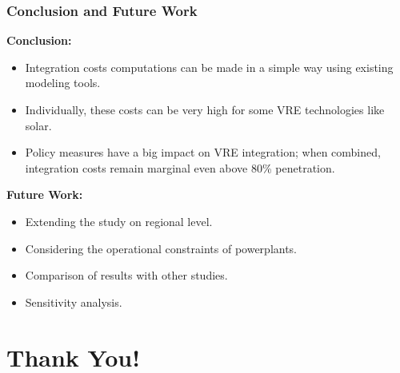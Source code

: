 \documentclass[aspectratio=169]{beamer}
\begin{document}
\begin{frame}[fragile]
  \frametitle{Conclusion and Future Work}

  \textbf{Conclusion:}
    \begin{itemize}
      \item {Integration costs computations can be made in a simple way using existing modeling tools.}
      \item {Individually, these costs can be very high for some VRE technologies like solar.}
      \item {Policy measures have a big impact on VRE integration; when combined, integration costs remain marginal even above 80\% penetration.}
    \end{itemize}

  \textbf{Future Work:}
    \begin{itemize}
      \item Extending the study on regional level.
      \item Considering the operational constraints of powerplants.
       \item Comparison of results with other studies.
      \item Sensitivity analysis.
      
    \end{itemize}
\end{frame}




\section{Thank You!}
\end{document}
